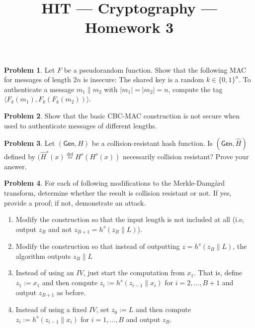 \documentclass[11pt]{article}
\title{HIT --- Cryptography --- Homework 3}
\theoremstyle{definition}
\providecommand{\abs}[1]{\lvert#1\rvert}
\newtheorem{problem}{Problem}
\begin{document}
\maketitle

\begin{problem}
Let $F$ be a pseudorandom function. Show that the following MAC for messages of length $2n$ is insecure: The shared key is a random $k\in \{0,1\}^n$. To authenticate a message $m_1\| m_2$ with $\abs{m_1} =\abs{m_2} = n$, compute the tag $\langle F_k(m_1), F_k(F_k(m_2))\rangle$. 
\end{problem}

\begin{problem}
Show that the basic CBC-MAC construction is not secure when used to authenticate messages of different lengths.
\end{problem}

\begin{problem}
Let $(\mathsf{Gen},H)$ be a collision-resistant hash function. Is $(\mathsf{Gen},\hat{H})$ defined by $(\hat{H}^s(x) \overset{\text{def}}{=} H^s(H^s(x))$ necessarily collision resistant? Prove your answer. 
\end{problem}

\begin{problem}
For each of following modifications to the Merkle-Damg\r{a}rd transform, determine whether the result is collision resistant or not. If yes, provide a proof; if not, demonstrate an attack.

\begin{enumerate}
\item Modify the construction so that the input length is not included at all (i.e, output $z_B$ and not $z_{B+1} = h^s(z_B\| L)$).
\item Modify the construction so that instead of outputting $z = h^s(z_B\| L)$, the algorithm outputs $z_B\|L$
\item Instead of using an $IV$, just start the computation from $x_1$. That is, define $z_1 := x_1$ and then compute $z_i := h^s(z_{i-1}\|x_i)$ for $i=2,\dotsc,B+1$ and output $z_{B+1}$ as before.
\item Instead of using a fixed $IV$, set $z_0 := L$ and then compute $z_i := h^s(z_{i-1}\|x_i)$ for $i=1,\dotsc,B$ and output $z_B$.
\end{enumerate}
\end{problem}
\end{document}
